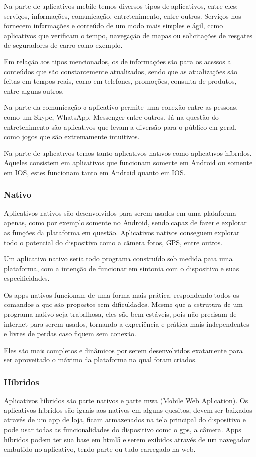 Na parte de aplicativos mobile temos diversos tipos de aplicativos, entre eles: serviços, informações, comunicação, entretenimento, entre outros. Serviços nos fornecem informações e conteúdo de um modo mais simples e ágil, como aplicativos que verificam o tempo, navegação de mapas ou solicitações de resgates de seguradores de carro como exemplo.

Em relação aos tipos mencionados, os de informações são para os acessos a conteúdos que são constantemente atualizados, sendo que as atualizações são feitas em tempos reais, como em telefones, promoções, consulta de produtos, entre alguns outros.

Na parte da comunicação o aplicativo permite uma conexão entre as pessoas, como um Skype, WhatsApp, Messenger entre outros. Já na questão do entretenimento são aplicativos que levam a diversão para o público em geral, como jogos que são extremamente intuitivos.

Na parte de aplicativos temos tanto aplicativos nativos como aplicativos híbridos. Aqueles consistem em aplicativos que funcionam somente em Android ou somente em IOS, estes funcionam tanto em Android quanto em IOS.

\subsubsection{Nativo}
Aplicativos nativos são desenvolvidos para serem usados em uma plataforma apenas, como por exemplo somente no Android, sendo capaz de fazer e explorar as funções da plataforma em questão. Aplicativos nativos conseguem explorar todo o potencial do dispositivo como a câmera fotos, GPS, entre outros.

Um aplicativo nativo seria todo programa construído sob medida para uma plataforma, com a intenção de funcionar em sintonia com o dispositivo e suas especificidades.

Os apps nativos funcionam de uma forma mais prática, respondendo todos os comandos a que são propostos sem dificuldades. Mesmo que a estrutura de um programa nativo seja trabalhosa, eles são bem estáveis, pois não precisam de internet para serem usados, tornando a experiência e prática mais independentes e livres de perdas caso fiquem sem conexão.

Eles são mais completos e dinâmicos por serem desenvolvidos exatamente para ser aproveitado o máximo da plataforma na qual foram criados.

\subsubsection{Híbridos}
Aplicativos híbridos são parte nativos e parte mwa (Mobile Web Aplication).  Os aplicativos híbridos são iguais aos nativos em alguns quesitos, devem ser baixados através de um app de loja, ficam armazenados na tela principal do dispositivo e pode usar todas as funcionalidades do dispositivo como o gps, a câmera. Apps híbridos podem ter sua base em html5 e serem exibidos através de um navegador embutido no aplicativo, tendo parte ou tudo carregado na web.

